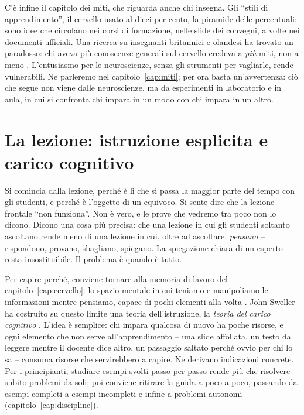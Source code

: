 C'è infine il capitolo dei miti, che riguarda anche chi insegna. Gli
\enquote{stili di apprendimento}, il cervello usato al dieci per
cento, la piramide delle percentuali: sono idee che circolano nei
corsi di formazione, nelle slide dei convegni, a volte nei documenti
ufficiali. Una ricerca su insegnanti britannici e olandesi ha trovato
un paradosso: chi aveva più conoscenze generali sul cervello credeva a
\emph{più} miti, non a meno \parencite{dekker2012}. L'entusiasmo per
le neuroscienze, senza gli strumenti per vagliarle, rende
vulnerabili. Ne parleremo nel capitolo~\ref{cap:miti}; per ora basta
un'avvertenza: ciò che segue non viene dalle neuroscienze, ma da
esperimenti in laboratorio e in aula, in cui si confronta chi impara
in un modo con chi impara in un altro.

\section{La lezione: istruzione esplicita e carico cognitivo}

Si comincia dalla lezione, perché è lì che si passa la maggior parte
del tempo con gli studenti, e perché è l'oggetto di un equivoco. Si
sente dire che la lezione frontale \enquote{non funziona}. Non è
vero, e le prove che vedremo tra poco non lo dicono. Dicono una cosa
più precisa: che una lezione in cui gli studenti soltanto ascoltano
rende meno di una lezione in cui, oltre ad ascoltare, \emph{pensano}
-- rispondono, provano, sbagliano, spiegano. La spiegazione chiara di
un esperto resta insostituibile. Il problema è quando è tutto.

Per capire perché, conviene tornare alla memoria di lavoro del
capitolo~\ref{cap:cervello}: lo spazio mentale in cui teniamo e
manipoliamo le informazioni mentre pensiamo, capace di pochi elementi
alla volta \parencite{cowan2001}. John Sweller ha costruito su questo
limite una teoria dell'istruzione, la \emph{teoria del carico
cognitivo} \parencite{sweller1988}. L'idea è semplice: chi impara
qualcosa di nuovo ha poche risorse, e ogni elemento che non serve
all'apprendimento -- una slide affollata, un testo da leggere mentre
il docente dice altro, un passaggio saltato perché ovvio per chi lo
sa -- consuma risorse che servirebbero a capire. Ne derivano
indicazioni concrete. Per i principianti, studiare esempi svolti passo
per passo rende più che risolvere subito problemi da soli; poi
conviene ritirare la guida a poco a poco, passando da esempi completi
a esempi incompleti e infine a problemi
autonomi (capitolo~\ref{cap:discipline}).

